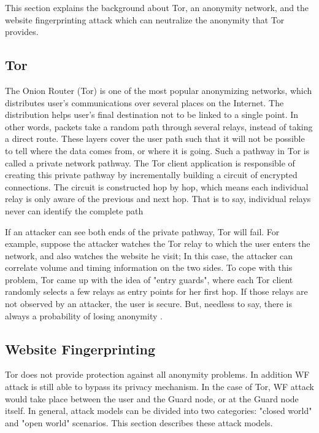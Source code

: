 
This section explains the background about Tor, an anonymity network, and the website fingerprinting attack which can neutralize the anonymity that Tor provides.

\subsection{Tor}
The Onion Router (Tor) is one of the most popular anonymizing networks, which distributes user's communications over several places on the Internet. The distribution helps user's final destination not to be linked to a single point. In other words, packets take a random path through several relays, instead of taking a direct route. These layers cover the user path such that it will not be possible to tell where the data comes from, or where it is going. Such a pathway in Tor is called a private network pathway. The Tor client application is responsible of creating this private pathway by incrementally building a circuit of encrypted connections. The circuit is constructed hop by hop, which means each individual relay is only aware of the previous and next hop. That is to say, individual relays never can identify the complete path \cite{TorPage, dingledine2004tor}

If an attacker can see both ends of the private pathway, Tor will fail. For example, suppose the attacker watches the Tor relay to which the user enters the network, and also watches the website he visit; In this case, the attacker can correlate volume and timing information on the two sides. To cope with this problem, Tor came up with the idea of "entry guards", where each Tor client randomly selects a few relays as entry points for her first hop. If those relays are not observed by an attacker, the user is secure. But, needless to say, there is always a probability of losing anonymity \cite{TorPage}.

\subsection{Website Fingerprinting}
Tor does not provide protection against all anonymity problems. In addition WF attack is still able to bypass its privacy mechanism. In the case of Tor, WF attack would take place between the user and the Guard node, or at the Guard node itself. In general, attack models can be divided into two categories: "closed world" and "open world" scenarios.  This section describes these attack models.

